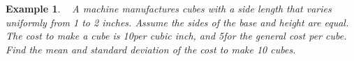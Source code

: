 \documentclass[12pt]{amsart}
\newtheorem{example}[theorem]{Example}
\begin{document}
{%
\begin{example}\label{29_EV_cube}\ \newline
A machine manufactures cubes with a side length that varies uniformly from 1 to 2 inches. Assume the sides of the base and height are equal. The cost to make a cube is 10\textcent per cubic inch, and 5\textcent for the general cost per cube. Find the mean and standard deviation of the cost to make 10 cubes.



%

\end{example}


}  %
\end{document}
